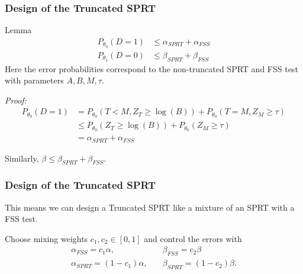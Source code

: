 \documentclass[10pt]{beamer}
\begin{document}
\begin{frame}
\frametitle{Design of the Truncated SPRT}

\begin{block}{Lemma}
\[
\begin{split}
P_{\theta_0}(D = 1) &\leq \alpha_{SPRT} + \alpha_{FSS} \\
P_{\theta_1}(D = 0) &\leq \beta_{SPRT} + \beta_{FSS}
\end{split}
\]
Here the error probabilities correspond to the non-truncated SPRT and FSS test with parameters $A, B, M, \tau$.
\end{block}

\textit{Proof:}
\[
\begin{split}
P_{\theta_0}(D = 1) &= P_{\theta_0}(T < M, Z_T \geq \log(B)) + P_{\theta_0}(T = M, Z_M \geq \tau) \\
    &\leq P_{\theta_0}(Z_T \geq \log(B)) + P_{\theta_0}(Z_M \geq \tau) \\
    &= \alpha_{SPRT} + \alpha_{FSS}
\end{split}
\]

Similarly, $\beta \leq \beta_{SPRT} + \beta_{FSS}$.

\end{frame}

\begin{frame}
\frametitle{Design of the Truncated SPRT}

This means we can design a Truncated SPRT like a mixture of an SPRT with a FSS test.

Choose mixing weights $c_1, c_2 \in [0, 1]$ and control the errors with
\[
\begin{split}
\alpha_{FSS} = c_1 \alpha, \quad &\beta_{FSS} = c_2 \beta \\
\alpha_{SPRT} = (1 - c_1) \alpha, \quad &\beta_{SPRT} = (1 - c_2) \beta.
\end{split}
\]

\end{frame}
\end{document}
